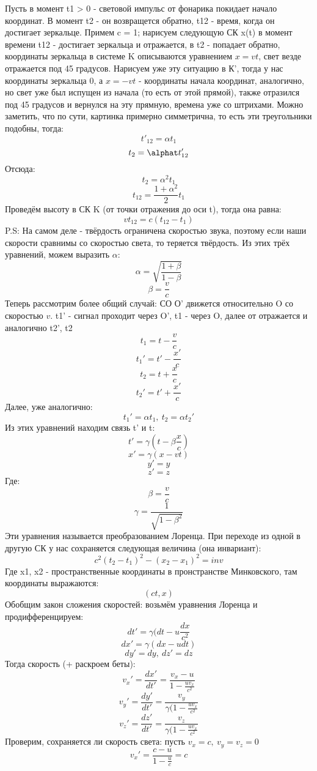Пусть в момент t1 > 0 - световой импульс от фонарика покидает начало координат.
В момент t2 - он возвращется обратно, t12 - время, когда он достигает зеркальце.
Примем c = 1;
нарисуем следующую СК x(t)
в момент времени t12 - достигает зеркальца и отражается, в t2 - попадает обратно, координаты зеркальца в системе K описываются уравнением $x = vt$, свет везде отражается под 45 градусов.
Нарисуем уже эту ситуацию в К', тогда у нас координаты зеркальца 0, а $x = -vt$ - координаты начала координат, аналогично, но свет уже был испущен из начала (то есть от этой прямой), также отразился под 45 градусов и вернулся на эту прямную, времена уже со штрихами. Можно заметить, что по сути, картинка примерно симметрична, то есть эти треугольники подобны, тогда:
\[t'_{12} = \alpha t_1\]
\[t_2 = \alphat t'_{12}\]
Отсюда:
\[t_2 = \alpha^2t_1\]
\[t_{12} = \frac{1 + \alpha^2}{2}t_1\]
Проведём высоту в СК K (от точки отражения до оси t), тогда она равна:
\[vt_{12} = c(t_{12} - t_1)\]
P.S: На самом деле - твёрдость ограничена скоростью звука, поэтому если наши скорости сравнимы со скоростью света, то теряется твёрдость.
Из этих трёх уравнений, можем выразить $\alpha$:
\[\alpha = \sqrt{\frac{1 + \beta}{1 - \beta}}\]
\[\beta = \frac{v}{c}\]
Теперь рассмотрим более общий случай:
СО О' движется относительно O со скоростью $v$.
t1' - сигнал проходит через O', t1 - через O, далее от отражается и аналогично t2', t2
\[t_1 = t - \frac{v}{c}\]
\[t_1' = t' - \frac{x'}{c}\]
\[t_2 = t + \frac{x}{c}\]
\[t_2' = t' + \frac{x'}{c}\]
Далее, уже аналогично:
\[t_1' = \alpha t_1, \ t_2 = \alpha t_2'\]
Из этих уравнений находим связь t' и t:
\[t' = \gamma(t - \beta \frac{x}{c})\]
\[x' = \gamma(x - vt)\]
\[y' = y\]
\[z' = z\]
Где:
\[\beta = \frac{v}{c}\]
\[\gamma = \frac{1}{\sqrt{1 - \beta^2}}\]
Эти уравнения называется преобразованием Лоренца.
При переходе из одной в другую СК у нас сохраняется следующая величина (она инвариант):
\[c^2(t_2 - t_1)^2 - (x_2 - x_1)^2 = inv\]
Где x1, x2 - пространственные координаты в пронстранстве Минковского, там координаты выражаются:
\[(ct, x)\]
Обобщим закон сложения скоростей: возьмём уравнения Лоренца и продифференцируем:
\[dt' = \gamma(dt - u \frac{dx}{c^2}\]
\[dx' = \gamma(dx - udt)\]
\[dy' = dy, \ dz' = dz\]
Тогда скорость (+ раскроем беты):
\[v_x' = \frac{dx'}{dt'} = \frac{v_x - u}{1 - \frac{uv_x}{c^2}}\]
\[v_y' = \frac{dy'}{dt'} = \frac{v_y}{\gamma(1 - \frac{uv_x}{c^2}}\]
\[v_z' = \frac{dz'}{dt'} = \frac{v_z}{\gamma(1 - \frac{uv_x}{c^2}}\]
Проверим, сохраняется ли скорость света:
пусть $v_x = c, \ v_y = v_z = 0$
\[v_x' = \frac{c - u}{1 - \frac{u}{c}} = c\]
